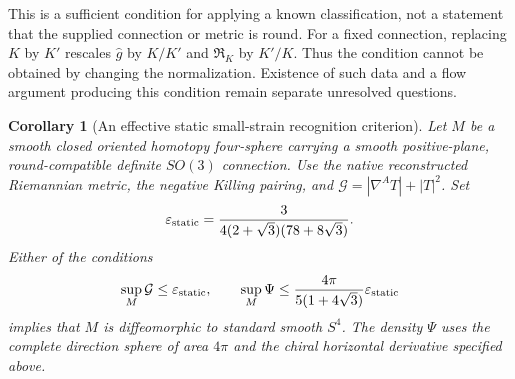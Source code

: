\documentclass[11pt]{article}
\numberwithin{equation}{section}
\newtheorem{corollary}[theorem]{Corollary}
\theoremstyle{definition}
\theoremstyle{remark}
\begin{document}
This is a sufficient condition for applying a known classification,
not a statement that the supplied connection or metric is round.
For a fixed connection, replacing $K$ by $K'$ rescales
$\widehat g$ by $K/K'$ and $\mathfrak R_K$ by $K'/K$.
Thus the condition cannot be obtained by changing the normalization.
Existence of such data and a flow argument producing this condition remain
separate unresolved questions.

\begin{corollary}[An effective static small-strain recognition criterion]
\label{cor:effective-static-recognition}
Let $M$ be a smooth closed oriented homotopy four-sphere carrying a smooth
positive-plane, round-compatible definite $SO(3)$ connection. Use the
native reconstructed Riemannian metric, the negative Killing pairing,
and $\mathcal G=|\nabla^AT|+|T|^2$. Set
\[
 \varepsilon_{\rm static}
   =\frac{3}{4(2+\sqrt3)(78+8\sqrt3)}.
\]
Either of the conditions
\[
 \sup_M\mathcal G\le\varepsilon_{\rm static},\qquad
 \sup_M\Psi\le\frac{4\pi}{5(1+4\sqrt3)}\varepsilon_{\rm static}
\]
implies that $M$ is diffeomorphic to standard smooth $S^4$.
The density $\Psi$ uses the complete direction sphere of area $4\pi$
and the chiral horizontal derivative specified above.
\end{corollary}
\end{document}
